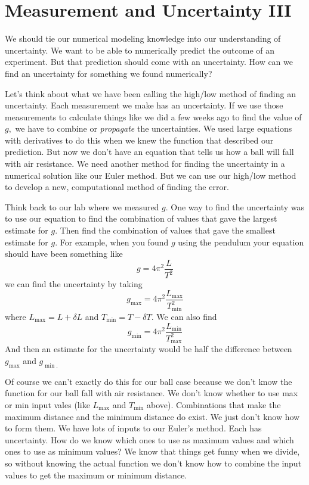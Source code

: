 \documentclass[twoside,11pt,ShortChapTitles]{BYUTextbook}
\begin{document}
\chapter{Measurement and Uncertainty III}

We should tie our numerical modeling knowledge into our understanding of
uncertainty. We want to be able to numerically predict the outcome of an
experiment. But that prediction should come with an uncertainty. How can we
find an uncertainty for something we found numerically?

Let's think about what we have been calling the high/low method of finding
an uncertainty. Each measurement we make has an uncertainty. If we use those
measurements to calculate things like we did a few weeks ago to find the
value of $g,$ we have to combine or \emph{propagate} the uncertainties. We
used large equations with derivatives to do this when we knew the function
that described our prediction. But now we don't have an equation that tells
us how a ball will fall with air resistance. We need another method for
finding the uncertainty in a numerical solution like our Euler method. But
we can use our high/low method to develop a new, computational method of
finding the error.

Think back to our lab where we measured $g.$ One way to find the uncertainty
was to use our equation to find the combination of values that gave the
largest estimate for $g.$ Then find the combination of values that gave the
smallest estimate for $g.$ For example, when you found $g$ using the
pendulum your equation should have been something like
\[
g=4\pi ^{2}\frac{L}{T^{2}}
\]%
we can find the uncertainty by taking
\[
g_{\max }=4\pi ^{2}\frac{L_{\max }}{T_{\min }^{2}}
\]%
where $L_{\max }=L+\delta L$ and $T_{\min }=T-\delta T.$ We can also find
\[
g_{\min }=4\pi ^{2}\frac{L_{\min }}{T_{\max }^{2}}
\]%
And then an estimate for the uncertainty would be half the difference
between $g_{\max }$ and $g_{\min .}$

Of course we can't exactly do this for our ball case because we don't know
the function for our ball fall with air resistance. We don't know whether to
use max or min input vales (like $L_{\max }$ and $T_{\min }$ above).
Combinations that make the maximum distance and the minimum distance do
exist. We just don't know how to form them. We have lots of inputs to our
Euler's method. Each has uncertainty. How do we know which ones to use as
maximum values and which ones to use as minimum values? We know that things
get funny when we divide, so without knowing the actual function we don't
know how to combine the input values to get the maximum or minimum distance.
\end{document}
